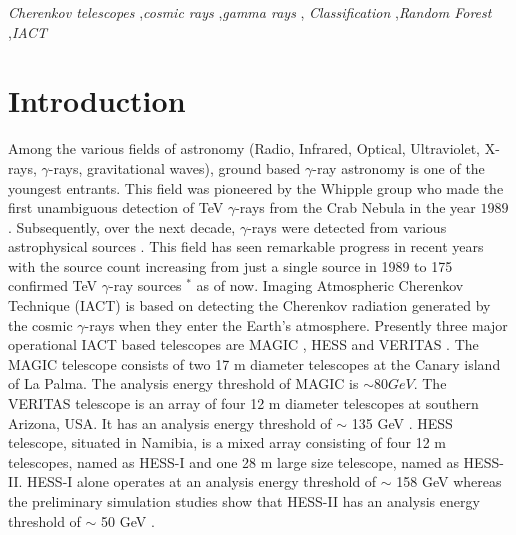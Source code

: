 \documentclass[preprint,12pt]{elsarticle}
\begin{document}
\begin{frontmatter}
\begin{keyword}
\emph{Cherenkov telescopes} \sep \emph{cosmic rays} \sep \emph{gamma rays} \sep 
\emph{Classification} \sep  \emph{Random Forest} \sep \emph{IACT} 




\end{keyword}

\end{frontmatter}


\section{Introduction}
Among the various fields of astronomy (Radio, Infrared, Optical, Ultraviolet, X-rays, $\gamma$-rays, gravitational waves), 
ground based $\gamma$-ray astronomy is one of the youngest entrants. 
This field was pioneered by the Whipple group who made the first unambiguous detection of TeV $\gamma$-rays from the Crab Nebula in the year $1989$  
\cite{crab}. Subsequently, over the next decade, $\gamma$-rays  were detected from various astrophysical sources \cite{review20gevtev}. 
This field has seen remarkable progress in recent years with the source count increasing from just a single source in 1989 to 175  
confirmed TeV $\gamma$-ray sources $^*$ as of now.
Imaging Atmospheric Cherenkov Technique (IACT) is based on detecting the Cherenkov radiation generated by 
the cosmic  $\gamma$-rays when they enter the Earth's atmosphere. Presently three major operational IACT based 
telescopes are MAGIC \cite{magic}, HESS \cite{hessI} and VERITAS \cite{veritas}. The MAGIC telescope consists of 
two 17 m diameter telescopes at the Canary island of La Palma. The analysis energy threshold 
of MAGIC is $\sim 80 GeV$. The VERITAS telescope is an array of four 12 m diameter telescopes at southern Arizona, USA. It  
has an analysis energy threshold of $\sim$ 135 GeV \cite{veritas135}. 
HESS telescope, situated in Namibia, is a mixed array consisting of four 12 m telescopes, named as HESS-I 
and one 28 m large size telescope, named as HESS-II. HESS-I alone operates at an 
analysis energy threshold of $\sim$ 158 GeV \cite{hessPC} 
whereas the preliminary simulation studies show that HESS-II has an 
analysis energy threshold of $\sim$ 50 GeV \cite{hess50gev}. 
\end{document}
